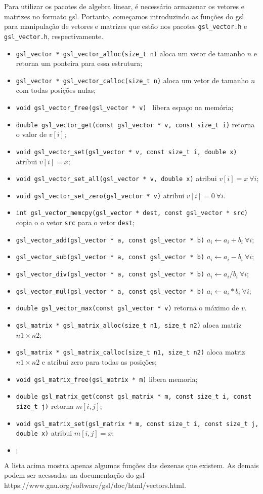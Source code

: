 Para utilizar os pacotes de algebra linear, é necessário armazenar os vetores e matrizes no formato gsl. Portanto, começamos introduzindo as funções do gsl para manipulação de vetores e matrizes que estão nos pacotes \verb|gsl_vector.h| e \verb|gsl_vector.h|, respectivamente.  
\begin{itemize}
 \item \verb|gsl_vector * gsl_vector_alloc(size_t n)| aloca um vetor de tamanho $n$ e retorna um ponteira para essa estrutura;
 \item \verb|gsl_vector * gsl_vector_calloc(size_t n)| aloca um vetor de tamanho $n$ com todas posições nulas;
\item \verb|void gsl_vector_free(gsl_vector * v) | libera espaço na memória;
\item \verb|double gsl_vector_get(const gsl_vector * v, const size_t i)| retorna o valor de $v[i]$;
 \item \verb|void gsl_vector_set(gsl_vector * v, const size_t i, double x)| atribui $v[i]=x$;
 \item \verb|void gsl_vector_set_all(gsl_vector * v, double x)|  atribui $v[i]=x\ \forall i$;
 \item \verb|void gsl_vector_set_zero(gsl_vector * v)|  atribui $v[i]=0\ \forall i$.
 \item \verb|int gsl_vector_memcpy(gsl_vector * dest, const gsl_vector * src)| copia o o vetor \verb|src| para o vetor \verb|dest|;
 \item \verb|gsl_vector_add(gsl_vector * a, const gsl_vector * b)| $a_i\leftarrow a_i+b_i\ \forall i$;
 \item \verb|gsl_vector_sub(gsl_vector * a, const gsl_vector * b)| $a_i\leftarrow a_i-b_i\ \forall i$;
 \item \verb|gsl_vector_div(gsl_vector * a, const gsl_vector * b)| $a_i\leftarrow a_i/b_i\ \forall i$;
 \item \verb|gsl_vector_mul(gsl_vector * a, const gsl_vector * b)| $a_i\leftarrow a_i*b_i\ \forall i$;
 \item \verb|double gsl_vector_max(const gsl_vector * v)| retorna o máximo de $v$.
 \item \verb|gsl_matrix * gsl_matrix_alloc(size_t n1, size_t n2)| aloca matriz $n1\times n2$;
 \item \verb|gsl_matrix * gsl_matrix_calloc(size_t n1, size_t n2)| aloca matriz $n1\times n2$ e atribui zero para todas as posições;
 \item \verb|void gsl_matrix_free(gsl_matrix * m)| libera memoria;
 \item \verb|double gsl_matrix_get(const gsl_matrix * m, const size_t i, const size_t j)| retorna $m[i,j]$;
 \item \verb|void gsl_matrix_set(gsl_matrix * m, const size_t i, const size_t j, double x)| atribui $m[i,j]=x$;
 \item $\vdots$
 \end{itemize}
A lista acima mostra apenas algumas funções das dezenas que existem. As demais podem ser acessadas na documentação do gsl https://www.gnu.org/software/gsl/doc/html/vectors.html.

